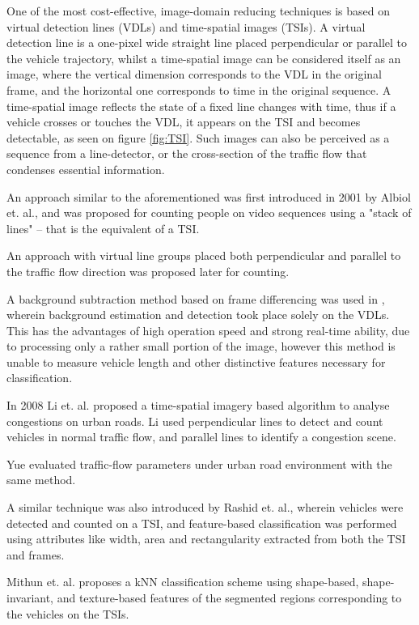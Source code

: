 One of the most cost-effective, image-domain reducing techniques is based on virtual detection lines (VDLs) and time-spatial images (TSIs).
A virtual detection line is a one-pixel wide straight line placed perpendicular or parallel to the vehicle trajectory, whilst a time-spatial image can be considered itself as an image, where the vertical dimension corresponds to the VDL in the original frame, and the horizontal one corresponds to time in the original sequence.
A time-spatial image reflects the state of a fixed line changes with time, thus if a vehicle crosses or touches the VDL, it appears on the TSI and becomes detectable, as seen on figure \ref{fig:TSI}.
Such images can also be perceived as a sequence from a line-detector, or the cross-section of the traffic flow that condenses essential information. 

An approach similar to the aforementioned was first introduced in 2001 by Albiol et. al., and was proposed for counting people on video sequences using a "stack of lines" -- that is the equivalent of a TSI\cite{Albiol2001}.

An approach with virtual line groups placed both perpendicular and parallel to the traffic flow direction was proposed later for counting\cite{Anan2006,Wu2007}.

A background subtraction method based on frame differencing was used in \cite{Anan2006, Wu2007}, wherein background estimation and detection took place solely on the VDLs.
This has the advantages of high operation speed and strong real-time ability, due to processing only a rather small portion of the image, however this method is unable to measure vehicle length and other distinctive features necessary for classification.

In 2008 Li et. al. proposed a time-spatial imagery based algorithm to analyse congestions on urban roads.
Li used perpendicular lines to detect and count vehicles in normal traffic flow, and parallel lines to identify a congestion scene\cite{Li2008}.

Yue evaluated traffic-flow parameters under urban road environment with the same method\cite{Yue2009}.

A similar technique was also introduced by Rashid et. al., wherein vehicles were detected and counted on a TSI, and feature-based classification was performed using attributes like width, area and rectangularity extracted from both the TSI and frames\cite{Rashid2010}.

Mithun et. al. proposes a kNN classification scheme using shape-based, shape-invariant, and texture-based features of the segmented regions corresponding to the vehicles on the TSIs\cite{Mithun2012a}.

